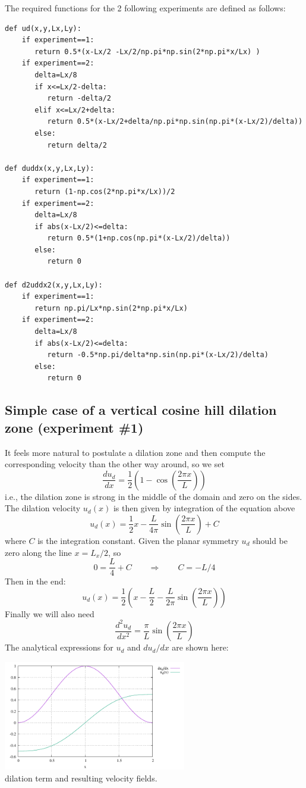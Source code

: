 The required functions for the 2 following experiments are defined as follows:
\begin{lstlisting}
def ud(x,y,Lx,Ly):
    if experiment==1:
       return 0.5*(x-Lx/2 -Lx/2/np.pi*np.sin(2*np.pi*x/Lx) )
    if experiment==2:
       delta=Lx/8
       if x<=Lx/2-delta: 
          return -delta/2
       elif x<=Lx/2+delta:
          return 0.5*(x-Lx/2+delta/np.pi*np.sin(np.pi*(x-Lx/2)/delta))
       else: 
          return delta/2

def duddx(x,y,Lx,Ly):
    if experiment==1:
       return (1-np.cos(2*np.pi*x/Lx))/2
    if experiment==2:
       delta=Lx/8
       if abs(x-Lx/2)<=delta: 
          return 0.5*(1+np.cos(np.pi*(x-Lx/2)/delta))
       else:
          return 0

def d2uddx2(x,y,Lx,Ly):
    if experiment==1:
       return np.pi/Lx*np.sin(2*np.pi*x/Lx)
    if experiment==2:
       delta=Lx/8
       if abs(x-Lx/2)<=delta: 
          return -0.5*np.pi/delta*np.sin(np.pi*(x-Lx/2)/delta)
       else:
          return 0
\end{lstlisting}


\subsection*{Simple case of a vertical cosine hill dilation zone (experiment \#1)}

It feels more natural to postulate a dilation zone and then compute the corresponding velocity
than the other way around, so we set
\[
\frac{d u_d}{d x} = \frac12 (1-\cos(\frac{2 \pi x}{L}))
\]
i.e., the dilation zone is strong in the middle of the domain and zero on the sides. 
The dilation velocity $u_d(x)$ is then given by integration of the equation above
\[
u_d(x) = \frac12x - \frac{L}{4\pi  }\sin (\frac{2 \pi x}{L}) +C
\]
where $C$ is the integration constant.
Given the planar symmetry $u_d$ should be zero along the line $x=L_x/2$, so 
\[
0 = \frac{L}{4}  + C \qquad \Rightarrow \qquad C = -L/4
\]
Then in the end:
\[
u_d(x) = \frac12 \left( x- \frac{L}{2} - \frac{L}{2\pi }\sin (\frac{2 \pi x}{L}) \right)
\]
Finally we will also need
\[
\frac{d^2 u_d}{d x^2} = \frac{\pi}{L}  \sin(\frac{2 \pi x}{L})
\]
The analytical expressions for $u_d$ and $du_d/dx$ are shown here:
\begin{center}
\includegraphics[width=8cm]{python_codes/fieldstone_175/results/exp1/analytical.pdf}\\
{\captionfont dilation term and resulting velocity fields.}
\end{center}



